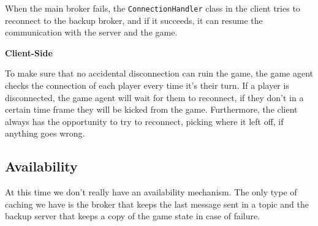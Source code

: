 \documentclass{scrartcl}
\begin{document}
\begin{itemize}
\begin{itemize}
                    When the main broker fails, the \texttt{ConnectionHandler} class in the client tries to reconnect to the backup broker, and if it succeeds, it can resume the communication with the server and the game. \newline
          \end{itemize}
          \textbf{Client-Side} \par
          To make sure that no accidental disconnection can ruin the game, the game agent checks the connection
          of each player every time it's their turn. If a player is disconnected, the game agent will wait for
          them to reconnect, if they don't in a certain time frame they will be kicked from the game. \newline
          Furthermore, the client always has the opportunity to try to reconnect, picking where it left
          off, if anything goes wrong.
\end{itemize}

\subsection{Availability}\label{availability}



At this time we don't really have an availability mechanism. \newline
The only type of caching we have is the broker that keeps the last message sent in a topic
and the backup server that keeps a copy of the game state in case of failure.
\end{document}
